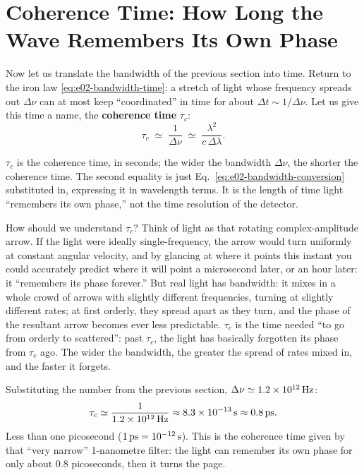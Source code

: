 \section{Coherence Time: How Long the Wave Remembers Its Own Phase}
\label{sec:e02-coherence-time}

Now let us translate the bandwidth of the previous section into time. Return to the iron law \eqref{eq:e02-bandwidth-time}: a stretch of light whose frequency spreads out \(\Delta\nu\) can at most keep ``coordinated'' in time for about \(\Delta t\sim1/\Delta\nu\). Let us give this time a name, the \textbf{coherence time} \(\tau_c\):
\begin{equation}
  \tau_c\;\simeq\;\frac{1}{\Delta\nu}
  \;\simeq\;\frac{\lambda^{2}}{c\,\Delta\lambda} .
  \label{eq:e02-coherence-time}
\end{equation}
\begin{formulaexplain}
\(\tau_c\) is the coherence time, in seconds; the wider the bandwidth \(\Delta\nu\), the shorter the coherence time. The second equality is just Eq.~\eqref{eq:e02-bandwidth-conversion} substituted in, expressing it in wavelength terms. It is the length of time light ``remembers its own phase,'' not the time resolution of the detector.
\end{formulaexplain}
How should we understand \(\tau_c\)? Think of light as that rotating complex-amplitude arrow. If the light were ideally single-frequency, the arrow would turn uniformly at constant angular velocity, and by glancing at where it points this instant you could accurately predict where it will point a microsecond later, or an hour later: it ``remembers its phase forever.'' But real light has bandwidth: it mixes in a whole crowd of arrows with slightly different frequencies, turning at slightly different rates; at first orderly, they spread apart as they turn, and the phase of the resultant arrow becomes ever less predictable. \(\tau_c\) is the time needed ``to go from orderly to scattered'': past \(\tau_c\), the light has basically forgotten its phase from \(\tau_c\) ago. The wider the bandwidth, the greater the spread of rates mixed in, and the faster it forgets.

Substituting the number from the previous section, \(\Delta\nu\simeq1.2\times10^{12}\,{\rm Hz}\):
\[
  \tau_c\simeq\frac{1}{1.2\times10^{12}\,{\rm Hz}}
  \approx8.3\times10^{-13}\,{\rm s}
  \approx0.8\,{\rm ps}.
\]
Less than one picosecond (\(1\,{\rm ps}=10^{-12}\,{\rm s}\)). This is the coherence time given by that ``very narrow'' 1-nanometre filter: the light can remember its own phase for only about 0.8 picoseconds, then it turns the page.

